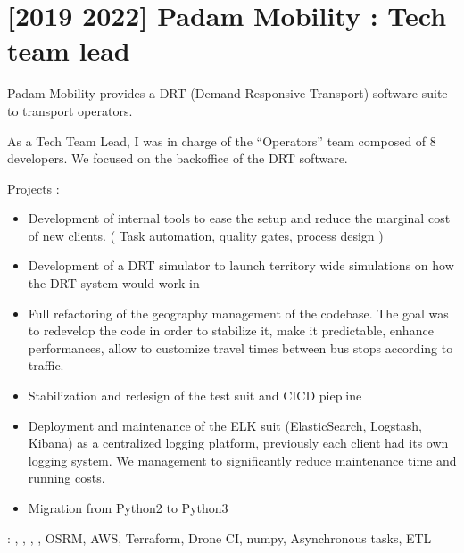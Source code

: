 \documentclass[letterpaper,10pt,english]{sphinxmanual}
\begin{document}
\section{{[}2019 \sphinxhyphen{} 2022{]} Padam Mobility : Tech team lead}
\label{\detokenize{index:padam-mobility-tech-team-lead}}
\sphinxAtStartPar
Padam Mobility provides a DRT (Demand Responsive Transport) software suite to transport operators.

\sphinxAtStartPar
As a Tech Team Lead, I was in charge of the “Operators” team composed of 8 developers. We focused on the backoffice of
the DRT software.

\sphinxAtStartPar
Projects :
\begin{itemize}
\item {} 
\sphinxAtStartPar
Development of internal tools to ease the setup and reduce the marginal cost of new clients.
( Task automation, quality gates, process design )

\item {} 
\sphinxAtStartPar
Development of a DRT simulator to launch territory wide simulations on how the DRT system would work in

\item {} 
\sphinxAtStartPar
Full refactoring of the geography management of the codebase. The goal was to re\sphinxhyphen{}develop the code in order to stabilize
it, make it predictable, enhance performances, allow to customize travel times between bus stops according to traffic.

\item {} 
\sphinxAtStartPar
Stabilization and re\sphinxhyphen{}design of the test suit and CI\sphinxhyphen{}CD piepline

\item {} 
\sphinxAtStartPar
Deployment and maintenance of the ELK suit (ElasticSearch, Logstash, Kibana) as a centralized logging platform,
previously each client had its own logging system. We management to significantly reduce maintenance time and running costs.

\item {} 
\sphinxAtStartPar
Migration from Python2 to Python3

\end{itemize}

\sphinxAtStartPar
{} : , , , , OSRM, AWS, Terraform,  Drone CI, numpy, Asynchronous tasks, ETL
\end{document}
